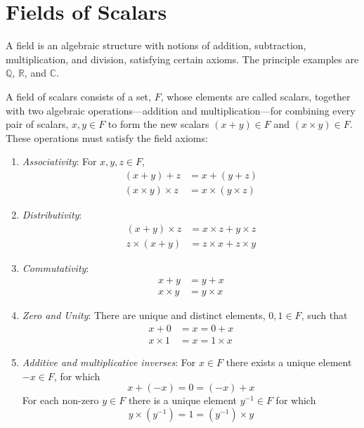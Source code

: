 \section{Fields of Scalars}
\label{sec:scalarfields}

A field is an algebraic structure with notions of addition,
subtraction, multiplication, and division, satisfying certain
axioms. The principle examples are $\mathbb{Q}$, $\mathbb{R}$, and
$\mathbb{C}$.

 \begin{definition}
   A field of scalars consists of a set, $F$, whose elements are
   called scalars, together with two algebraic
   operations---addition and multiplication---for combining every
   pair of scalars, $x, y \in F$ to form the new scalars $(x+y) \in
   F$ and $(x \times y) \in F$.  These operations must satisfy the
  field axioms:
  \begin{enumerate}
  \item {\em Associativity}: For $x,y,z \in F$,
    \begin{align*}
      (x+y)+ z &= x+(y+z) \\
      (x\times y)\times z &= x \times (y \times z)
    \end{align*}
  \item {\em Distributivity}:
    \begin{align*}
      (x+y) \times z &= x \times z + y \times z \\
      z \times (x + y) &= z \times x + z \times y
    \end{align*}
  \item {\em Commutativity}:
    \begin{align*}
      x + y &= y + x \\
      x \times y &= y \times x
    \end{align*}
  \item {\em Zero and Unity}: There are unique and distinct
    elements, $0, 1 \in F$, such that
    \begin{align*}
      x+0 &= x = 0 + x \\
      x \times 1 &= x = 1 \times x
    \end{align*}
  \item {\em Additive and multiplicative inverses}: For $x \in F$
    there exists a unique element $-x \in F$, for which
    \[ x + (-x) = 0 = (-x)+x \] For each non-zero $y \in F$ there
    is a unique element $y^{-1} \in F$ for which \[ y \times
    (y^{-1}) = 1 = (y^{-1})\times y \]
  \end{enumerate}
 \end{definition}

